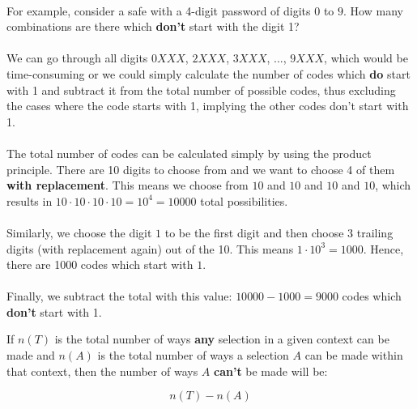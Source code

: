 \documentclass[12pt, a4paper, titlepage, twoside]{article}
\begin{document}
	\paragraph{}
	For example, consider a safe with a 4-digit password of digits $0$ to $9$. How many combinations are there which \textbf{don't}
	start with the digit 1?
	
	\paragraph{}
	We can go through all digits $0XXX$, $2XXX$, $3XXX$, ..., $9XXX$, which would be time-consuming or we could simply calculate the
	number of codes which \textbf{do} start with 1 and subtract it from the total number of possible codes, thus excluding the cases
	where the code starts with 1, implying the other codes don't start with 1.
	
	\paragraph{}
	The total number of codes can be calculated simply by using the product principle. There are 10 digits to choose from and we want to
	choose 4 of them \textbf{with replacement}. This means we choose from $10$ and $10$ and $10$ and $10$, which results in
	$10 \cdot 10 \cdot 10 \cdot 10 = 10^4 = \num{10 000}$ total possibilities.
	
	\paragraph{}
	Similarly, we choose the digit $1$ to be the first digit and then choose 3 trailing digits (with replacement again) out of the 10.
	This means $1 \cdot 10^3 = 1000$. Hence, there are 1000 codes which start with $1$.
	
	\paragraph{}
	Finally, we subtract the total with this value: $10 000 - 1000 = 9000$ codes which \textbf{don't} start with 1.\\
	
	\begin{kp}
		If $n(T)$ is the total number of ways \textbf{any} selection in a given context can be made and $n(A)$ is the total number 
		of ways a selection $A$ can be made within that context, then the number of ways $A$ \textbf{can't} be made will be:
		
		$$n(T) - n(A)$$
	\end{kp}
	
\end{document}
